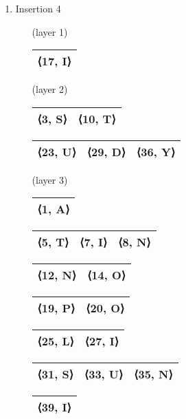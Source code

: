 \documentclass{article}
\begin{document}
\begin{enumerate}
    \item Insertion 4
    \begin{enumerate}
        \item [(layer 1)]
            \begin{tabular}{|c|}
                \hline
                    ⟨17, I⟩ \\
                    \hline
            \end{tabular} \;
        \item [(layer 2)]
            \begin{tabular}{|c|c|}
                \hline
                    ⟨3, S⟩ & ⟨10, T⟩ \\
                \hline
            \end{tabular} \;
            \begin{tabular}{|c|c|c|}
                \hline
                    ⟨23, U⟩ & ⟨29, D⟩ & ⟨36, Y⟩ \\
                \hline
            \end{tabular} \;
        \item [(layer 3)]
            \begin{tabular}{|c|}
                \hline
                    ⟨1, A⟩ \\
                \hline
            \end{tabular} \;
            \begin{tabular}{|c|c|c|}
                \hline
                    ⟨5, T⟩ & ⟨7, I⟩ & ⟨8, N⟩ \\
                \hline
            \end{tabular} \;
            \begin{tabular}{|c|c|}
                \hline
                    ⟨12, N⟩ & ⟨14, O⟩ \\
                \hline
            \end{tabular} \;
            \begin{tabular}{|c|c|}
                \hline
                    ⟨19, P⟩ & ⟨20, O⟩ \\
                \hline
            \end{tabular} \;
            \begin{tabular}{|c|c|}
                \hline
                    ⟨25, L⟩ & ⟨27, I⟩ \\
                \hline
            \end{tabular} \;
            \begin{tabular}{|c|c|c|}
                \hline
                    ⟨31, S⟩ & ⟨33, U⟩ & ⟨35, N⟩ \\
                \hline
            \end{tabular} \;
            \begin{tabular}{|c|}
                \hline
                    ⟨39, I⟩ \\
                \hline
            \end{tabular} \;
        \end{enumerate}
\end{enumerate}
\setlength{\tabcolsep}{6pt}
\end{document}
